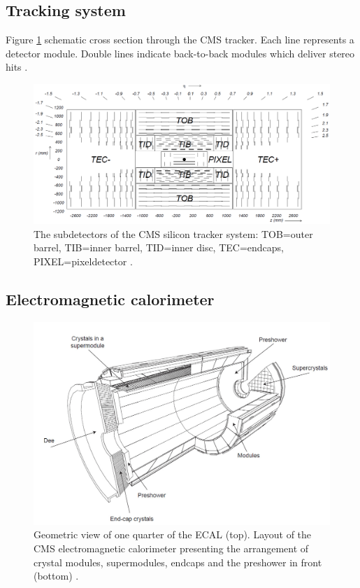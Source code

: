 \subsection{Tracking system} \label{subsec-TrackingSystem}

Figure \ref{fig-Tracker} schematic cross section through the CMS tracker. Each line represents a detector module. Double lines indicate back-to-back modules which deliver stereo hits \cite{CMSexperiment}.

\begin{figure}\label{fig-Tracker}
\includegraphics[width=\textwidth]{Figures/Tracker.png}
\caption{The subdetectors of the CMS silicon tracker system: TOB=outer barrel, TIB=inner barrel, TID=inner disc, TEC=endcaps, PIXEL=pixeldetector \cite{ref-}.}
\end{figure}

\subsection{Electromagnetic calorimeter} \label{subsec-ElectromagneticCalorimeter}

\begin{figure}\label{fig-ECAL}
\includegraphics[width=\textwidth]{Figures/ECAL.png}
\caption{Geometric view of one quarter of the ECAL (top). Layout of the CMS electromagnetic calorimeter presenting the arrangement of crystal modules, supermodules, endcaps and the preshower in front (bottom) \cite{CMSexperiment}.}
\end{figure}

